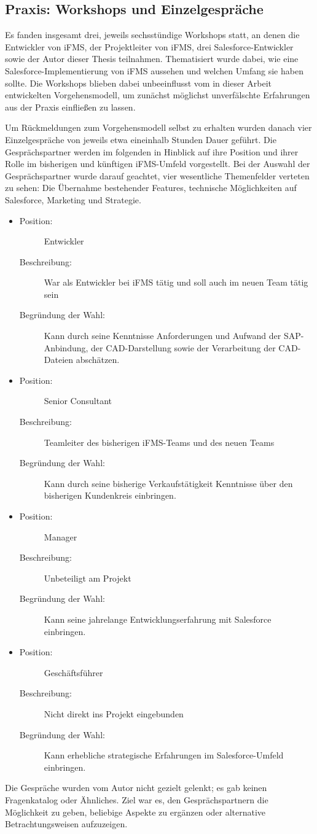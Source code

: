 \subsection{Praxis: Workshops und Einzelgespräche}
Es fanden insgesamt drei, jeweils sechsstündige Workshops statt, an denen die 
Entwickler von iFMS, der Projektleiter von iFMS, drei 
Salesforce-Entwickler sowie der Autor dieser Thesis teilnahmen. Thematisiert 
wurde dabei, wie eine Salesforce-Implementierung von iFMS aussehen und welchen 
Umfang sie haben sollte. Die Workshops blieben dabei unbeeinflusst vom in 
dieser Arbeit entwickelten Vorgehensmodell, um zunächst möglichst unverfälschte 
Erfahrungen aus der Praxis einfließen zu lassen.

Um Rückmeldungen zum Vorgehensmodell selbst zu erhalten wurden danach 
vier Einzelgespräche von jeweils etwa eineinhalb Stunden Dauer geführt. 
Die Gesprächspartner werden im folgenden in Hinblick auf ihre Position und 
ihrer Rolle im bisherigen und künftigen iFMS-Umfeld vorgestellt. Bei 
der Auswahl der Gesprächspartner wurde darauf geachtet, vier 
wesentliche Themenfelder verteten zu sehen: Die Übernahme bestehender 
Features, technische Möglichkeiten auf Salesforce, Marketing und 
Strategie. 

\newcommand{\person}[3]{\begin{description}
                        	\item[Position:] #1
				\item[Beschreibung:] #2
                        	\item[Begründung der Wahl:] #3
                        \end{description}
}
\begin{itemize}
\item \person{Entwickler}{War als Entwickler bei iFMS tätig und soll auch im 
neuen Team tätig sein}{Kann durch seine 
Kenntnisse Anforderungen und Aufwand der SAP-Anbindung, der CAD-Darstellung 
sowie der Verarbeitung der CAD-Dateien abschätzen.}
\item \person{Senior Consultant}{Teamleiter des bisherigen iFMS-Teams und des 
neuen Teams}{Kann durch seine bisherige Verkaufstätigkeit Kenntnisse über den 
 bisherigen Kundenkreis einbringen.}
\item \person{Manager}{Unbeteiligt am Projekt}{Kann seine jahrelange 
Entwicklungserfahrung mit Salesforce einbringen.}
\item \person{Geschäftsführer}{Nicht direkt ins Projekt eingebunden}{Kann 
erhebliche strategische Erfahrungen im Salesforce-Umfeld einbringen.}
\end{itemize}
Die Gespräche wurden vom Autor nicht gezielt gelenkt; es gab keinen 
Fragenkatalog oder Ähnliches. Ziel war es, den Gesprächspartnern die 
Möglichkeit zu geben, beliebige Aspekte zu ergänzen oder alternative 
Betrachtungsweisen aufzuzeigen.
\label{cha:praxis}
